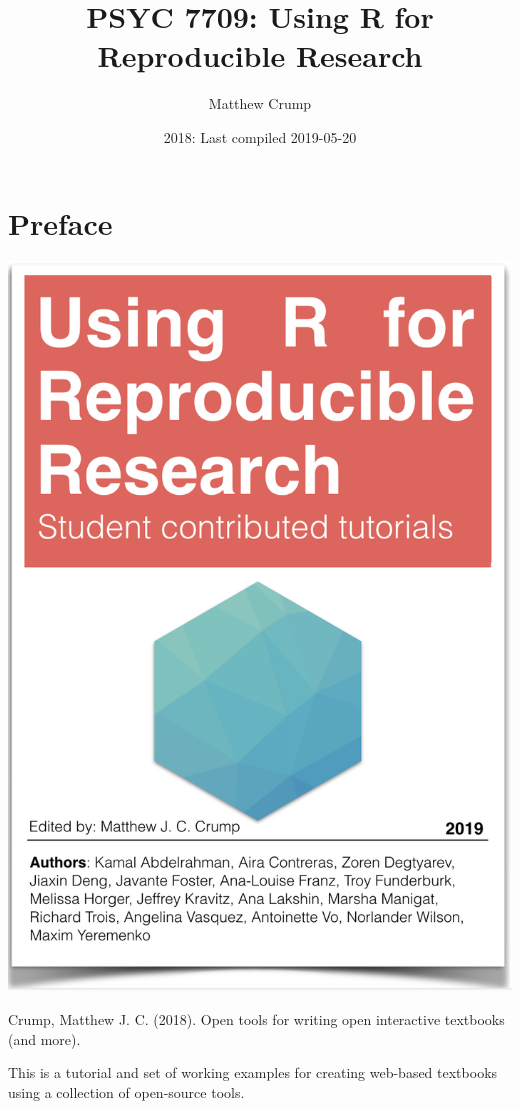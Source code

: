 \documentclass[]{book}
\title{PSYC 7709: Using R for Reproducible Research}
\author{Matthew Crump}
\date{2018: Last compiled 2019-05-20}
\begin{document}
\maketitle

{
\setcounter{tocdepth}{1}
\tableofcontents
}
\hypertarget{preface}{%
\chapter*{Preface}\label{preface}}

\begin{center}\includegraphics{OER} \end{center}

Crump, Matthew J. C. (2018). Open tools for writing open interactive textbooks (and more).

This is a tutorial and set of working examples for creating web-based textbooks using a collection of open-source tools.
\end{document}
